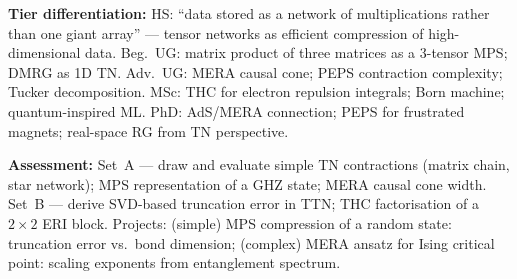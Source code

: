\documentclass[11pt,a4paper]{article}
\begin{document}
\begin{tcolorbox}[modulebox, title={Module~II.1 / L08: Tensor Networks}]
\medskip\textbf{Tier differentiation:}
HS: ``data stored as a network of multiplications rather than one giant array'' ---
tensor networks as efficient compression of high-dimensional data.
Beg.\ UG: matrix product of three matrices as a 3-tensor MPS; DMRG as 1D TN.
Adv.\ UG: MERA causal cone; PEPS contraction complexity; Tucker decomposition.
MSc: THC for electron repulsion integrals; Born machine; quantum-inspired ML.
PhD: AdS/MERA connection; PEPS for frustrated magnets; real-space RG from TN perspective.

\medskip\textbf{Assessment:}
Set~A --- draw and evaluate simple TN contractions (matrix chain, star network);
MPS representation of a GHZ state; MERA causal cone width.
Set~B --- derive SVD-based truncation error in TTN; THC factorisation of a $2\times2$ ERI block.
Projects: (simple) MPS compression of a random state: truncation error vs.\ bond dimension;
(complex) MERA ansatz for Ising critical point: scaling exponents from entanglement spectrum.
\end{tcolorbox}

\medskip
\end{document}

